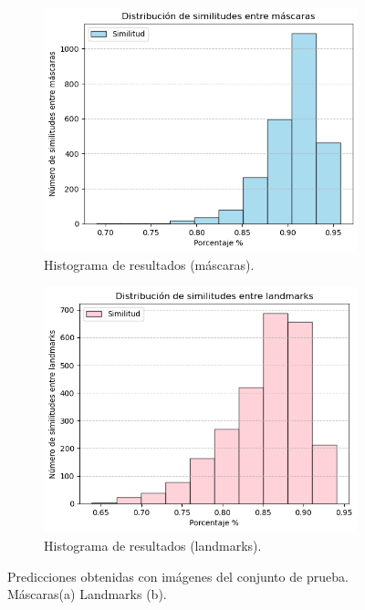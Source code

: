 \documentclass[runningheads]{llncs}
\begin{document}
\begin{figure}
    \centering
    \begin{subfigure}{0.45\linewidth}
        \centering
        \includegraphics[scale= 0.3]{images/histograma_mascaras.png}
        \caption{Histograma de resultados (máscaras).}
    \end{subfigure}
    \begin{subfigure}{0.45\linewidth}
        \centering
        \includegraphics[scale= 0.3]{images/histograma_landmarks.png}
        \caption{Histograma de resultados (landmarks).}
    \end{subfigure}
    \caption{Predicciones obtenidas con imágenes del conjunto de prueba. Máscaras(a) Landmarks (b).}
\end{figure}
\end{document}
